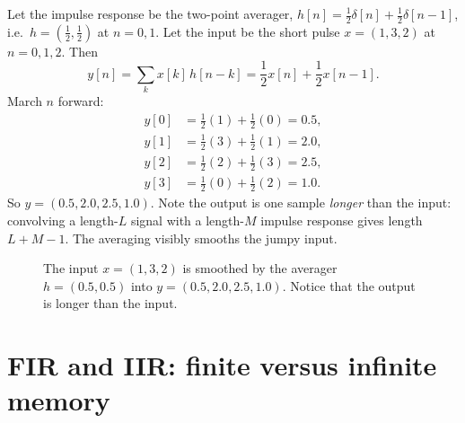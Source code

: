 \begin{example}
\label{ch12:hand-conv}
Let the impulse response be the two-point averager, $h[n] = \tfrac12\delta[n] +
\tfrac12\delta[n-1]$, i.e.\ $h = (\tfrac12, \tfrac12)$ at $n=0,1$. Let the input
be the short pulse $x = (1, 3, 2)$ at $n=0,1,2$. Then
\[
  y[n] = \sum_k x[k]\,h[n-k]
       = \frac{1}{2} x[n] + \frac{1}{2} x[n-1].
\]
March $n$ forward:
\begin{align*}
 y[0] &= \frac{1}{2}(1) + \frac{1}{2}(0) = 0.5, \\
 y[1] &= \frac{1}{2}(3) + \frac{1}{2}(1) = 2.0, \\
 y[2] &= \frac{1}{2}(2) + \frac{1}{2}(3) = 2.5, \\
 y[3] &= \frac{1}{2}(0) + \frac{1}{2}(2) = 1.0.
\end{align*}
So $y = (0.5, 2.0, 2.5, 1.0)$. Note the output is one sample \emph{longer} than
the input: convolving a length-$L$ signal with a length-$M$ impulse response
gives length $L+M-1$. The averaging visibly smooths the jumpy input.

\begin{figure}[H]
\centering
{}
\caption{The input $x = (1, 3, 2)$ is smoothed by the averager $h = (0.5, 0.5)$ into $y = (0.5, 2.0, 2.5, 1.0)$. Notice that the output is longer than the input.}
\label{ch12:fig-hand-conv}
\end{figure}

\end{example}

\section{FIR and IIR: finite versus infinite memory}
\label{ch12:fir-iir}

